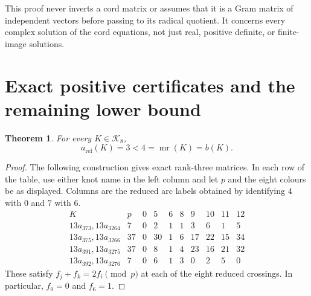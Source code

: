 \documentclass[11pt]{article}
\newtheorem{theorem}{Theorem}
\newcommand{\mr}{\operatorname{mr}}
\begin{document}
This proof never inverts a cord matrix or assumes that it is a Gram
matrix of independent vectors before passing to its radical quotient.
It concerns every complex solution of the cord equations, not just
real, positive definite, or finite-image solutions.

\section{Exact positive certificates and the remaining lower bound}

\begin{theorem}\label{thm:positive}
For every $K\in\mathcal K_8$,
\[
                      a_{\mathrm{ref}}(K)=3<4=\mr(K)=b(K).
\]
\end{theorem}
\begin{proof}
The following construction gives exact rank-three matrices. In each
row of the table, use either knot name in the left column and let
$p$ and the eight colours be as displayed. Columns are the reduced
arc labels obtained by identifying $4$ with $0$ and $7$ with $6$.
\[
\begin{array}{c|r|rrrrrrrr}
 K&p&0&5&6&8&9&10&11&12\\\hline
13a_{373},13a_{3264}&7&0&2&1&1&3&6&1&5\\
13a_{375},13a_{3266}&37&0&30&1&6&17&22&15&34\\
13a_{391},13a_{3275}&37&0&8&1&4&23&16&21&32\\
13a_{392},13a_{3276}&7&0&6&1&3&0&2&5&0
\end{array}
\]
These satisfy $f_j+f_k=2f_i\pmod p$ at each of the eight reduced
crossings. In particular, $f_0=0$ and $f_6=1$.


\end{proof}
\end{document}
